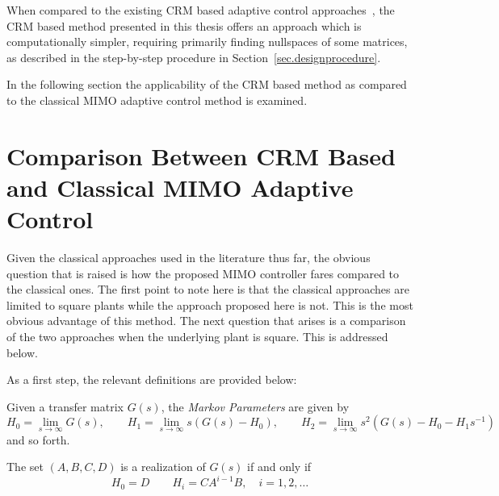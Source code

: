 \begin{rem-dan}
  When compared to the existing CRM based adaptive control approaches\ \cite{lavretsky.output.2010, lavretskywise.book.2013, qu.gnc.2013}, the  CRM based method presented in this thesis offers an approach which is computationally simpler, requiring primarily finding nullspaces of some matrices, as described in the step-by-step procedure in Section~\ref{sec.designprocedure}.
\end{rem-dan}

In the following section the applicability of the CRM based method as compared to the classical MIMO adaptive control method is examined.

\section{Comparison Between CRM Based and Classical MIMO Adaptive Control}\label{sec.AdaptiveComparison}

Given the classical approaches used in the  literature thus far, the obvious question that is raised is how the proposed MIMO controller fares compared to the classical ones.
The first point to note here is that the classical approaches are limited to square plants while the approach proposed here is not.
This is the most obvious advantage of this method.
The next question that arises is a comparison of the two approaches when the underlying plant is square.
This is addressed below.

As a first step, the relevant definitions are provided below:

\begin{defn-dan}\cite{antsaklis.linearsystems.2006}\label{defn.markov}
  Given a transfer matrix $G(s)$, the \textit{Markov Parameters} are given by
  \begin{equation*}
    H_{0}=\lim_{s\rightarrow\infty}G(s),
    \qquad
    H_{1}=\lim_{s\rightarrow\infty}s(G(s)-H_{0}),
    \qquad
    H_{2}=\lim_{s\rightarrow\infty}s^{2}(G(s)-H_{0}-H_{1}s^{-1})
  \end{equation*}
  and so forth.
\end{defn-dan}

\begin{thm-dan}\label{thm.markov_realization}
  The set $(A,B,C,D)$ is a realization of $G(s)$ if and only if
  \begin{equation*}
    H_{0}=D
    \qquad
    H_{i}=CA^{i-1}B, \quad i=1,2,\dots
  \end{equation*}
\end{thm-dan}

